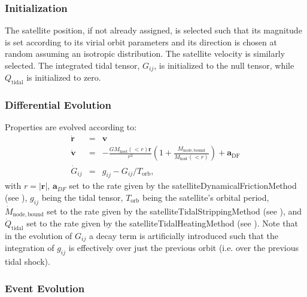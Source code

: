 \subsubsection{Initialization}

The satellite position, if not already assigned, is selected such that its magnitude is set according to its virial orbit parameters and its direction is chosen at random assuming an isotropic distribution.  The satellite velocity is similarly selected.  The integrated tidal tensor, $G_{ij}$, is initialized to the null tensor, while $Q_\mathrm{tidal}$ is initialized to zero.

\subsubsection{Differential Evolution}

Properties are evolved according to:
\begin{eqnarray}
\dot{\mathbf{r}}&=&\mathbf{v}\\
\dot{\mathbf{v}}&=&-\frac{G M_\mathrm{host}(<r)\mathbf{r}}{r^3}\left(1+\frac{M_\mathrm{node,bound}}{M_\mathrm{host}(<r)}\right)+\mathbf{a}_\mathrm{DF}\\
\dot{G}_{ij}&=&g_{ij}-G_{ij}/T_\mathrm{orb},
\end{eqnarray}
with $r=|\mathbf{r}|$, $\mathbf{a}_{DF}$ set to the rate given by the {\normalfont \ttfamily satelliteDynamicalFrictionMethod} (see ), $g_{ij}$ being the tidal tensor, $T_\mathrm{orb}$ being the satellite's orbital period, $\dot{M}_\mathrm{node,bound}$ set to the rate given by the {\normalfont \ttfamily satelliteTidalStrippingMethod} (see ), and $\dot{Q}_\mathrm{tidal}$ set to the rate given by the {\normalfont \ttfamily satelliteTidalHeatingMethod} (see ). Note that in the evolution of $G_{ij}$ a decay term is artificially introduced such that the integration of $g_{ij}$ is effectively over just the previous orbit (i.e. over the previous tidal shock).

\subsubsection{Event Evolution}

